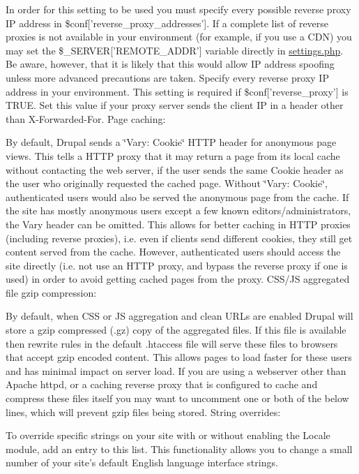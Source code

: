 In order for this setting to be used you must specify every possible reverse proxy IP address in \$conf\mbox{[}'reverse\_\-proxy\_\-addresses'\mbox{]}. If a complete list of reverse proxies is not available in your environment (for example, if you use a CDN) you may set the \$\_\-SERVER\mbox{[}'REMOTE\_\-ADDR'\mbox{]} variable directly in \hyperlink{settings_8php}{settings.php}. Be aware, however, that it is likely that this would allow IP address spoofing unless more advanced precautions are taken. Specify every reverse proxy IP address in your environment. This setting is required if \$conf\mbox{[}'reverse\_\-proxy'\mbox{]} is TRUE. Set this value if your proxy server sends the client IP in a header other than X-\/Forwarded-\/For. Page caching:

By default, Drupal sends a \char`\"{}Vary: Cookie\char`\"{} HTTP header for anonymous page views. This tells a HTTP proxy that it may return a page from its local cache without contacting the web server, if the user sends the same Cookie header as the user who originally requested the cached page. Without \char`\"{}Vary:
 Cookie\char`\"{}, authenticated users would also be served the anonymous page from the cache. If the site has mostly anonymous users except a few known editors/administrators, the Vary header can be omitted. This allows for better caching in HTTP proxies (including reverse proxies), i.e. even if clients send different cookies, they still get content served from the cache. However, authenticated users should access the site directly (i.e. not use an HTTP proxy, and bypass the reverse proxy if one is used) in order to avoid getting cached pages from the proxy. CSS/JS aggregated file gzip compression:

By default, when CSS or JS aggregation and clean URLs are enabled Drupal will store a gzip compressed (.gz) copy of the aggregated files. If this file is available then rewrite rules in the default .htaccess file will serve these files to browsers that accept gzip encoded content. This allows pages to load faster for these users and has minimal impact on server load. If you are using a webserver other than Apache httpd, or a caching reverse proxy that is configured to cache and compress these files itself you may want to uncomment one or both of the below lines, which will prevent gzip files being stored. String overrides:

To override specific strings on your site with or without enabling the Locale module, add an entry to this list. This functionality allows you to change a small number of your site's default English language interface strings.

